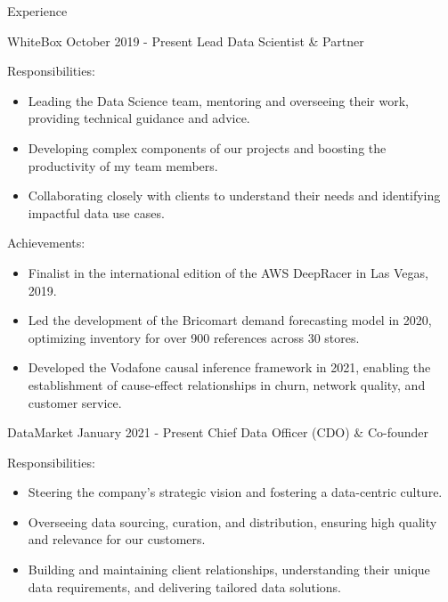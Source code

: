 \documentclass{cv}
\begin{document}
		\begin{rSection}{Experience}
		
		\begin{rSubsection}
			{WhiteBox}
			{October 2019 - Present}
			{Lead Data Scientist \& Partner}
			
			\item Responsibilities:
			\begin{itemize}
				\item Leading the Data Science team, mentoring and overseeing their work, providing technical guidance and advice.
				\item Developing complex components of our projects and boosting the productivity of my team members.
				\item Collaborating closely with clients to understand their needs and identifying impactful data use cases.
			\end{itemize}
			
			\vspace{2mm}
			
			\item Achievements:
			\begin{itemize}
				\item Finalist in the international edition of the AWS DeepRacer in Las Vegas, 2019.
				\item Led the development of the Bricomart demand forecasting model in 2020, optimizing inventory for over 900 references across 30 stores.
				\item Developed the Vodafone causal inference framework in 2021, enabling the establishment of cause-effect relationships in churn, network quality, and customer service.
			\end{itemize}
			
		\end{rSubsection}
	
		
		\begin{rSubsection}
			{DataMarket}
			{January 2021 - Present}
			{Chief Data Officer (CDO) \& Co-founder}

			\item Responsibilities:
			\begin{itemize}
				\item Steering the company's strategic vision and fostering a data-centric culture.
				\item Overseeing data sourcing, curation, and distribution, ensuring high quality and relevance for our customers.
				\item Building and maintaining client relationships, understanding their unique data requirements, and delivering tailored data solutions.
			\end{itemize}
			

\end{rSubsection}
\end{rSection}
\end{document}
